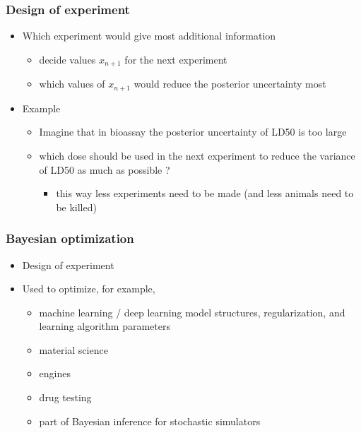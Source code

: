 \documentclass[10pt,handout]{beamer}
\begin{document}
\begin{frame}

\frametitle{Design of experiment}

  \begin{itemize}
  \item Which experiment would give most additional information
    \begin{itemize}
    \item decide values $x_{n+1}$ for the next experiment
    \item which values of $x_{n+1}$ would reduce the posterior
      uncertainty most
    \end{itemize}
  \item Example
    \begin{itemize}
    \item Imagine that in bioassay the posterior uncertainty of LD50 is too large
    \item which dose should be used in the next experiment to reduce
      the variance of LD50 as much as possible ?
      \begin{itemize}
        \item this way less experiments need to be made (and less animals need to be killed)
      \end{itemize}
    \end{itemize}
  \end{itemize}
\end{frame}

\begin{frame}

\frametitle{Bayesian optimization}

  \begin{itemize}
  \item Design of experiment
  \item Used to optimize, for example,
    \begin{itemize}
    \item machine learning / deep learning model structures,
      regularization, and learning algorithm parameters
    \item material science
    \item engines
    \item drug testing
    \item part of Bayesian inference for stochastic simulators
    \end{itemize}
  \end{itemize}

\end{frame}
\end{document}
